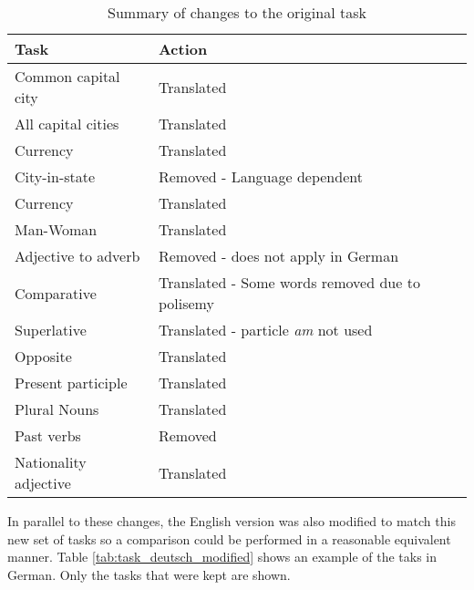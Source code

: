  \begin{table}[h]
   \centering
   \caption{Summary of changes to the original task } 
   \label{tab:summary_of_changes_task}
   \small
   \begin{tabular}{ |l|l|  }

   \hline           
   Task  & Action   \\  \hline           
   Common capital city & Translated \\
   All capital cities  & Translated \\
   Currency & Translated  \\ 
   City-in-state   &  Removed - Language dependent \\
   Currency & Translated  \\
   Man-Woman  & Translated  \\
   Adjective to adverb  &  Removed - does not apply in German \\
   Comparative & Translated - Some words removed due to polisemy \\ 
   Superlative & Translated - particle \textit{am} not used \\
   Opposite  & Translated \\
   Present participle & Translated \\
   Plural Nouns  & Translated \\
   Past verbs &  Removed \\

   Nationality adjective & Translated \\
   
\hline

  
\end{tabular}
\end{table}
    
In parallel to these changes, the English version was also modified to match
this new set of tasks so a comparison could be performed in a reasonable
equivalent manner.  Table \ref{tab:task_deutsch_modified} shows an example of the taks in German.
Only the tasks that were kept are shown.


